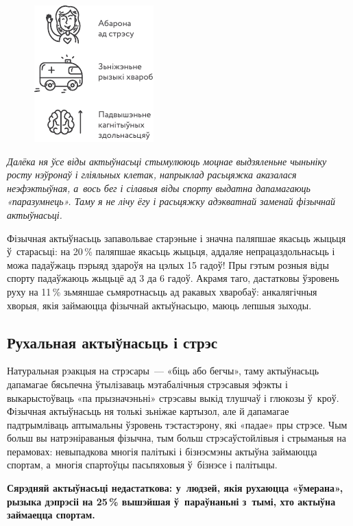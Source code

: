 \begin{figure}[htb!]
  \centering
  \includegraphics[scale=1.5]{willpower/ch5/3.pdf}
\end{figure}

\emph{Далёка ня ўсе віды актыўнасьці стымулююць моцнае выдзяленьне чыньніку росту нэўронаў і гліяльных клетак, напрыклад расьцяжка аказалася неэфэктыўная, а~вось бег і сілавыя віды спорту выдатна дапамагаюць «паразумнець». Таму я не лічу ёгу і расьцяжку адэкватнай заменай фізычнай актыўнасьці.}

Фізычная актыўнасьць запавольвае старэньне і значна паляпшае якасьць жыцьця ў~старасьці: на 20\,\% паляпшае якасьць жыцьця, аддаляе непрацаздольнасьць і можа падаўжаць пэрыяд здароўя на цэлых 15 гадоў! Пры гэтым розныя віды спорту падаўжаюць жыцьцё ад 3 да 6 гадоў. Акрамя таго, дастатковы ўзровень руху на 11\,\% зьмяншае сьмяротнасьць ад ракавых хваробаў: анкалягічныя хворыя, якія займаюцца фізычнай актыўнасьцю, маюць лепшыя зыходы.

\subsection*{Рухальная актыўнасьць і стрэс}

Натуральная рэакцыя на стрэсары~--- «біць або бегчы», таму актыўнасьць дапамагае бясьпечна ўтылізаваць мэтабалічныя стрэсавыя эфэкты і выкарыстоўваць «па прызначэньні» стрэсавы выкід тлушчаў і глюкозы ў~кроў. Фізычная актыўнасьць ня толькі зьніжае картызол, але й дапамагае падтрымліваць аптымальны ўзровень тэстастэрону, які «падае» пры стрэсе. Чым больш вы натрэніраваныя фізычна, тым больш стрэсаўстойлівыя і стрыманыя на перамовах: невыпадкова многія палітыкі і бізнэсмэны актыўна займаюцца спортам, а~многія спартоўцы пасьпяховыя ў~бізнэсе і палітыцы. 

\textbf{Сярэдняй актыўнасьці недастаткова: у~людзей, якія рухаюцца «ўмерана», рызыка дэпрэсіі на 25\,\% вышэйшая ў~параўнаньні з~тымі, хто актыўна займаецца спортам.}

